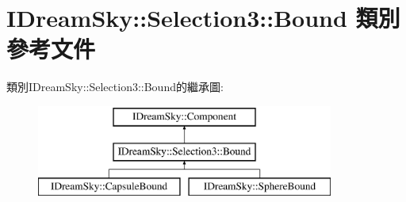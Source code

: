 \hypertarget{class_i_dream_sky_1_1_selection3_1_1_bound}{}\section{I\+Dream\+Sky\+:\+:Selection3\+:\+:Bound 類別 參考文件}
\label{class_i_dream_sky_1_1_selection3_1_1_bound}
類別\+I\+Dream\+Sky\+:\+:Selection3\+:\+:Bound的繼承圖\+:\begin{figure}[H]
\begin{center}
\leavevmode
\includegraphics[height=3.000000cm]{class_i_dream_sky_1_1_selection3_1_1_bound}
\end{center}
\end{figure}
